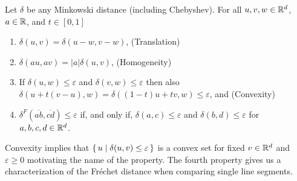 \begin{lemma}\label{lem:distance_properties}
	Let \(\delta\) be any Minkowski distance (including Chebyshev). For all \(u, v, w \in \mathbb{R}^d\), \(a \in \mathbb{R}\), and \(t \in [0, 1]\)
  \begin{enumerate}
		\item \(\delta(u, v) = \delta(u - w, v - w)\), \hfill (Translation)
		\item \(\delta(a u, a v) = |a| \delta(u, v)\), \hfill (Homogeneity)
		\item If \(\delta(u, w) \leq \varepsilon\) and \(\delta(v, w) \leq \varepsilon\) then also \(\delta(u + t(v-u), w) = \delta((1-t)u + tv, w) \leq \varepsilon\), and \hfill (Convexity)
		\item \(\delta^F(\overline{ab}, \overline{cd}) \leq \varepsilon\) if, and only if, \(\delta(a, c) \leq \varepsilon\) and \(\delta(b, d) \leq \varepsilon\) for \(a,b,c,d \in \mathbb{R}^d\).
	\end{enumerate}

\end{lemma}

Convexity implies that \(\set{u \mid \delta(u, v) \leq \varepsilon }\) is a convex set for fixed \(v \in \mathbb{R}^d\) and \(\varepsilon \geq 0\) motivating the name of the property. The fourth property gives us a characterization of the Fréchet distance when comparing single line segments. 

